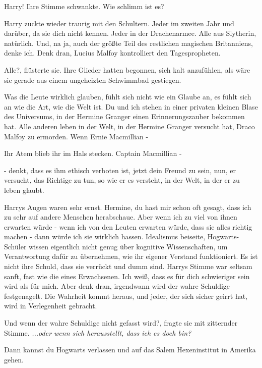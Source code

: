 \glqq Harry!\grqq{} Ihre Stimme schwankte. \glqq Wie schlimm ist es?\grqq{}

Harry zuckte wieder traurig mit den Schultern. \glqq Jeder im zweiten Jahr und
darüber, da sie dich nicht kennen. Jeder in der Drachenarmee. Alle aus
Slytherin, natürlich. Und, na ja, auch der größte Teil des restlichen magischen
Britanniens, denke ich. Denk dran, Lucius Malfoy kontrolliert den
Tagespropheten.\grqq{}

\glqq Alle?\grqq{}, flüsterte sie. Ihre Glieder hatten begonnen, sich kalt
anzufühlen, als wäre sie gerade aus einem ungeheizten Schwimmbad gestiegen.

\glqq Was die Leute wirklich glauben, fühlt sich nicht wie ein Glaube an, es
fühlt sich an wie die Art, wie die Welt ist. Du und ich stehen in einer privaten
kleinen Blase des Universums, in der Hermine Granger einen Erinnerungszauber
bekommen hat. Alle anderen leben in der Welt, in der Hermine Granger versucht
hat, Draco Malfoy zu ermorden. Wenn Ernie Macmillian -\grqq{}

Ihr Atem blieb ihr im Hals stecken. Captain Macmillian -

\glqq - denkt, dass es ihm ethisch verboten ist, jetzt dein Freund zu sein, nun,
er versucht, das Richtige zu tun, so wie er es versteht, in der Welt, in der er
zu leben glaubt.\grqq{}

Harrys Augen waren sehr ernst. \glqq Hermine, du hast mir schon oft gesagt, dass
ich zu sehr auf andere Menschen herabschaue. Aber wenn ich zu viel von ihnen
erwarten würde - wenn ich von den Leuten erwarten würde, dass sie alles richtig
machen - dann würde ich sie wirklich hassen. Idealismus beiseite,
Hogwarts-Schüler wissen eigentlich nicht genug über kognitive Wissenschaften, um
Verantwortung dafür zu übernehmen, wie ihr eigener Verstand funktioniert. Es ist
nicht ihre Schuld, dass sie verrückt und dumm sind.\grqq{} Harrys Stimme war
seltsam sanft, fast wie die eines Erwachsenen. \glqq Ich weiß, dass es für dich
schwieriger sein wird als für mich. Aber denk dran, irgendwann wird der wahre
Schuldige festgenagelt. Die Wahrheit kommt heraus, und jeder, der sich sicher
geirrt hat, wird in Verlegenheit gebracht.\grqq{}

\glqq Und wenn der wahre Schuldige nicht gefasst wird?\grqq{}, fragte sie mit
zitternder Stimme. \emph{...oder wenn sich herausstellt, dass ich es doch bin?}

\glqq Dann kannst du Hogwarts verlassen und auf das Salem Hexeninstitut in
Amerika gehen.\grqq{}


